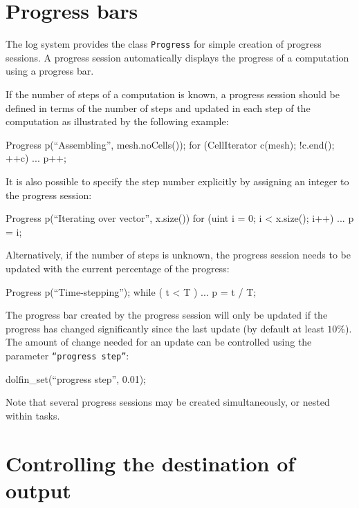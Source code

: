 \section{Progress bars}

The \dolfin{} log system provides the class \texttt{Progress} for
simple creation of progress sessions. A progress session automatically
displays the progress of a computation using a progress bar.

If the number of steps of a computation is known, a progress session
should  be defined in terms of the number of steps and updated in each
step of the computation as illustrated by the following example:
\begin{code}
Progress p(``Assembling'', mesh.noCells());  
for (CellIterator c(mesh); !c.end(); ++c)
{
  ...
  p++;
}
\end{code}
It is also possible to specify the step number explicitly by assigning
an integer to the progress session:
\begin{code}
Progress p(``Iterating over vector'', x.size())
for (uint i = 0; i < x.size(); i++)
{
  ...
  p = i;
}
\end{code}

Alternatively, if the number of steps is unknown, the progress session
needs to be updated with the current percentage of the progress:
\begin{code}
Progress p(``Time-stepping'');
while ( t < T )
{
  ...
  p = t / T;
}
\end{code}

The progress bar created by the progress session will only be updated
if the progress has changed significantly since the last update (by
default at least $10\%$). The
amount of change needed for an update can be controlled using the
parameter \texttt{``progress step''}:
\begin{code}
dolfin_set(``progress step'', 0.01);
\end{code}

Note that several progress sessions may be created simultaneously, or
nested within tasks.

\section{Controlling the destination of output}

